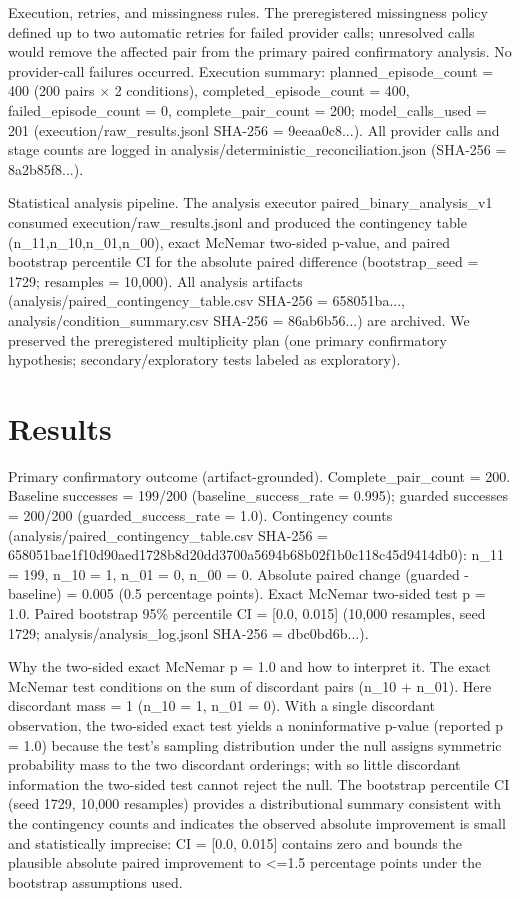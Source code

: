 \documentclass[conference]{IEEEtran}
\begin{document}
Execution, retries, and missingness rules. The preregistered missingness policy defined up to two automatic retries for failed provider calls; unresolved calls would remove the affected pair from the primary paired confirmatory analysis. No provider-call failures occurred. Execution summary: planned\_episode\_count = 400 (200 pairs \ensuremath{\times} 2 conditions), completed\_episode\_count = 400, failed\_episode\_count = 0, complete\_pair\_count = 200; model\_calls\_used = 201 (execution/raw\_results.jsonl SHA-256 = 9eeaa0c8...). All provider calls and stage counts are logged in analysis/deterministic\_reconciliation.json (SHA-256 = 8a2b85f8...).

Statistical analysis pipeline. The analysis executor paired\_binary\_analysis\_v1 consumed execution/raw\_results.jsonl and produced the contingency table (n\_11,n\_10,n\_01,n\_00), exact McNemar two-sided p-value, and paired bootstrap percentile CI for the absolute paired difference (bootstrap\_seed = 1729; resamples = 10,000). All analysis artifacts (analysis/paired\_contingency\_table.csv SHA-256 = 658051ba..., analysis/condition\_summary.csv SHA-256 = 86ab6b56...) are archived. We preserved the preregistered multiplicity plan (one primary confirmatory hypothesis; secondary/exploratory tests labeled as exploratory).

\section{Results}
Primary confirmatory outcome (artifact-grounded). Complete\_pair\_count = 200. Baseline successes = 199/200 (baseline\_success\_rate = 0.995); guarded successes = 200/200 (guarded\_success\_rate = 1.0). Contingency counts (analysis/paired\_contingency\_table.csv SHA-256 = 658051bae1f10d90aed1728b8d20dd3700a5694b68b02f1b0c118c45d9414db0): n\_11 = 199, n\_10 = 1, n\_01 = 0, n\_00 = 0. Absolute paired change (guarded - baseline) = 0.005 (0.5 percentage points). Exact McNemar two-sided test p = 1.0. Paired bootstrap 95\% percentile CI = [0.0, 0.015] (10,000 resamples, seed 1729; analysis/analysis\_log.jsonl SHA-256 = dbc0bd6b...).

Why the two-sided exact McNemar p = 1.0 and how to interpret it. The exact McNemar test conditions on the sum of discordant pairs (n\_10 + n\_01). Here discordant mass = 1 (n\_10 = 1, n\_01 = 0). With a single discordant observation, the two-sided exact test yields a noninformative p-value (reported p = 1.0) because the test's sampling distribution under the null assigns symmetric probability mass to the two discordant orderings; with so little discordant information the two-sided test cannot reject the null. The bootstrap percentile CI (seed 1729, 10,000 resamples) provides a distributional summary consistent with the contingency counts and indicates the observed absolute improvement is small and statistically imprecise: CI = [0.0, 0.015] contains zero and bounds the plausible absolute paired improvement to <=1.5 percentage points under the bootstrap assumptions used.
\end{document}
